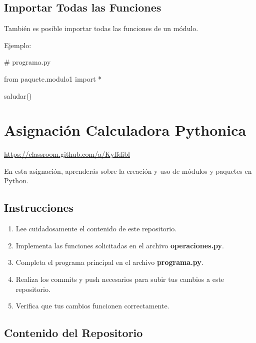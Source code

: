 \documentclass[
  a4paper,
  DIV=11,
  numbers=noendperiod,
  onepage,
  openany]{scrreprt}
\newenvironment{Shaded}{\begin{snugshade}}{\end{snugshade}}
\newcommand{\CommentTok}[1]{\textcolor[rgb]{0.37,0.37,0.37}{#1}}
\newcommand{\ImportTok}[1]{\textcolor[rgb]{0.00,0.46,0.62}{#1}}
\newcommand{\NormalTok}[1]{\textcolor[rgb]{0.00,0.23,0.31}{#1}}
\newcommand{\OperatorTok}[1]{\textcolor[rgb]{0.37,0.37,0.37}{#1}}
\providecommand{\tightlist}{%
  \setlength{\itemsep}{0pt}\setlength{\parskip}{0pt}}\usepackage{longtable,booktabs,array}
\begin{document}
\section{Importar Todas las
Funciones}\label{importar-todas-las-funciones-1}

También es posible importar todas las funciones de un módulo.

Ejemplo:

\begin{Shaded}
\begin{Highlighting}[]
\CommentTok{\# programa.py}

\ImportTok{from}\NormalTok{ paquete.modulo1 }\ImportTok{import} \OperatorTok{*}

\NormalTok{saludar()}
\end{Highlighting}
\end{Shaded}

\chapter{Asignación Calculadora
Pythonica}\label{asignaciuxf3n-calculadora-pythonica}

\url{https://classroom.github.com/a/Kyffdibl}

En esta asignación, aprenderás sobre la creación y uso de módulos y
paquetes en Python.

\section{Instrucciones}\label{instrucciones-1}

\begin{enumerate}
\def\labelenumi{\arabic{enumi}.}
\tightlist
\item
  Lee cuidadosamente el contenido de este repositorio.
\item
  Implementa las funciones solicitadas en el archivo
  \textbf{operaciones.py}.
\item
  Completa el programa principal en el archivo \textbf{programa.py}.
\item
  Realiza los commits y push necesarios para subir tus cambios a este
  repositorio.
\item
  Verifica que tus cambios funcionen correctamente.
\end{enumerate}

\section{Contenido del Repositorio}\label{contenido-del-repositorio-1}
\end{document}

